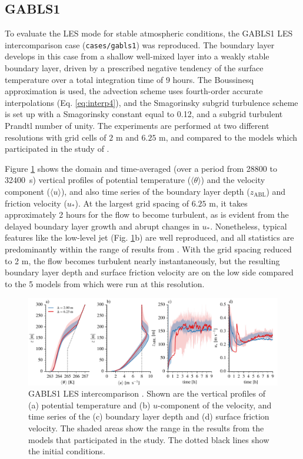 \documentclass[gmd,manuscript]{copernicus}
\begin{document}
\subsection{GABLS1}
To evaluate the LES mode for stable atmospheric conditions, the GABLS1 LES intercomparison case \citep{Beare2006} (\texttt{cases/gabls1}) was reproduced. The boundary layer develops in this case from a shallow well-mixed layer into a weakly stable boundary layer, driven by a prescribed negative tendency of the surface temperature over a total integration time of 9 hours. The Boussinesq approximation is used, the advection scheme uses fourth-order accurate interpolations (Eq. \ref{eq:interp4}), and the Smagorinsky subgrid turbulence scheme is set up with a Smagorinsky constant equal to 0.12, and a subgrid turbulent Prandtl number of unity. The experiments are performed at two different resolutions with grid cells of $2$ m and $6.25$ m, and compared to the models which participated in the study of \cite{Beare2006}. 

Figure \ref{fig:gabls} shows the domain and time-averaged (over a period from 28800 to 32400~s) vertical profiles of potential temperature ($\langle \theta \rangle$) and the velocity component ($\langle u \rangle$), and also time series of the boundary layer depth ($z_\mathrm{ABL}$) and friction velocity ($u_*$). At the largest grid spacing of $6.25$ m, it takes approximately 2 hours for the flow to become turbulent, as is evident from the delayed boundary layer growth and abrupt changes in $u_*$. Nonetheless, typical features like the low-level jet (Fig. \ref{fig:gabls}b) are well reproduced, and all statistics are predominantly within the range of results from \cite{Beare2006}. With the grid spacing reduced to 2 m, the flow becomes turbulent nearly instantaneously, but the resulting boundary layer depth and surface friction velocity are on the low side compared to the 5 models from \cite{Beare2006} which were run at this resolution. 

\begin{figure}[t]
\vspace*{2mm}
\begin{center}
\includegraphics[width=16.6cm]{figs/gmd_gabls_prof_tser.pdf}
\end{center}
\caption{GABLS1 LES intercomparison \citep{Beare2006}. Shown are the vertical profiles of (a) potential temperature and (b) $u$-component of the velocity, and time series of the (c) boundary layer depth and (d) surface friction velocity. The shaded areas show the range in the results from the models that participated in the \citet{Beare2006} study. The dotted black lines show the initial conditions.}
\label{fig:gabls}
\end{figure}
\end{document}
